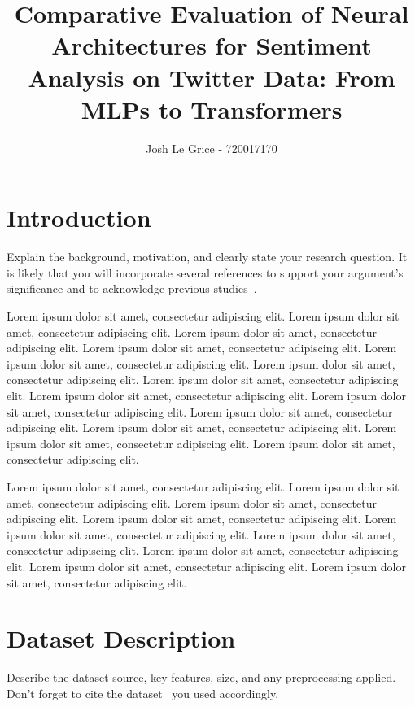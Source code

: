 \documentclass[english]{article}
\begin{document}

\title{\bf Comparative Evaluation of Neural Architectures for Sentiment Analysis on Twitter Data: From MLPs to Transformers}
\author{Josh Le Grice - 720017170}
\date{}
\maketitle
\thispagestyle{fancy}


\section{Introduction}
Explain the background, motivation, and clearly state your research question. It is likely that you will incorporate several references to support your argument's significance and to acknowledge previous studies~\cite{sato2016majorana}.

Lorem ipsum dolor sit amet, consectetur adipiscing elit. 
Lorem ipsum dolor sit amet, consectetur adipiscing elit. 
Lorem ipsum dolor sit amet, consectetur adipiscing elit. 
Lorem ipsum dolor sit amet, consectetur adipiscing elit. 
Lorem ipsum dolor sit amet, consectetur adipiscing elit. 
Lorem ipsum dolor sit amet, consectetur adipiscing elit. 
Lorem ipsum dolor sit amet, consectetur adipiscing elit. 
Lorem ipsum dolor sit amet, consectetur adipiscing elit. 
Lorem ipsum dolor sit amet, consectetur adipiscing elit. 
Lorem ipsum dolor sit amet, consectetur adipiscing elit. 
Lorem ipsum dolor sit amet, consectetur adipiscing elit. 
Lorem ipsum dolor sit amet, consectetur adipiscing elit. 
Lorem ipsum dolor sit amet, consectetur adipiscing elit. 

Lorem ipsum dolor sit amet, consectetur adipiscing elit. 
Lorem ipsum dolor sit amet, consectetur adipiscing elit. 
Lorem ipsum dolor sit amet, consectetur adipiscing elit. 
Lorem ipsum dolor sit amet, consectetur adipiscing elit. 
Lorem ipsum dolor sit amet, consectetur adipiscing elit. 
Lorem ipsum dolor sit amet, consectetur adipiscing elit. 
Lorem ipsum dolor sit amet, consectetur adipiscing elit. 
Lorem ipsum dolor sit amet, consectetur adipiscing elit. 
Lorem ipsum dolor sit amet, consectetur adipiscing elit. 

\section{Dataset Description}
Describe the dataset source, key features, size, and any preprocessing applied. Don't forget to cite the dataset~\cite{foucault2000order} you used accordingly.
\end{document}
